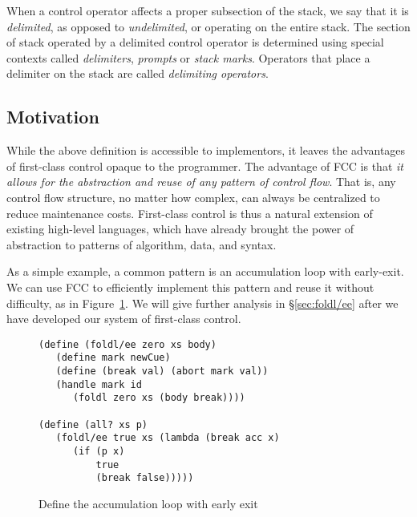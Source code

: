 \documentclass[11pt]{article}
\newcommand{\maybePage}{\newpage}
\begin{document}
When a control operator affects a proper subsection of the stack, we say that it is \emph{delimited}, as opposed to \emph{undelimited}, or operating on the entire stack.
The section of stack operated by a delimited control operator is determined using special contexts called \emph{delimiters}, \emph{prompts} or \emph{stack marks}.
Operators that place a delimiter on the stack are called \emph{delimiting operators}.


\maybePage
\subsection{Motivation}

While the above definition is accessible to implementors, it leaves the advantages of first-class control opaque to the programmer.
The advantage of FCC is that \emph{it allows for the abstraction and reuse of any pattern of control flow}.
That is, any control flow structure, no matter how complex, can always be centralized to reduce maintenance costs.
First-class control is thus a natural extension of existing high-level languages, which have already brought the power of abstraction to patterns of algorithm, data, and syntax.

As a simple example, a common pattern is an accumulation loop with early-exit.
We can use FCC to efficiently implement this pattern and reuse it without difficulty, as in Figure~\ref{fig:ex-foldl/ee}.
We will give further analysis in \S\ref{sec:foldl/ee} after we have developed our system of first-class control.

\begin{figure}
\caption{Define the accumulation loop with early exit}
\label{fig:ex-foldl/ee}
\begin{verbatim}
(define (foldl/ee zero xs body)
   (define mark newCue)
   (define (break val) (abort mark val))
   (handle mark id
      (foldl zero xs (body break))))

(define (all? xs p)
   (foldl/ee true xs (lambda (break acc x)
      (if (p x)
          true
          (break false)))))
\end{verbatim}
\end{figure}
\end{document}
